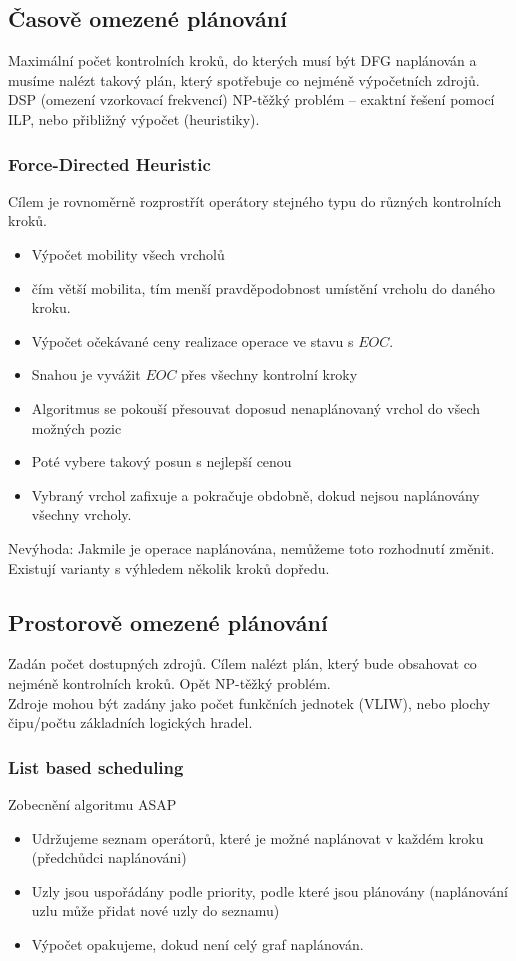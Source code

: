 \documentclass[a4paper, 11pt]{report}
\begin{document}
\subsection{Časově omezené plánování}
Maximální počet kontrolních kroků, do kterých musí být DFG naplánován a musíme nalézt takový plán, který spotřebuje co nejméně výpočetních zdrojů.
DSP (omezení vzorkovací frekvencí)
NP-těžký problém -- exaktní řešení pomocí ILP, nebo přibližný výpočet (heuristiky).

\subsubsection{Force-Directed Heuristic}
Cílem je rovnoměrně rozprostřít operátory stejného typu do různých kontrolních kroků.
\begin{itemize}
	\item Výpočet mobility všech vrcholů
	\item čím větší mobilita, tím menší pravděpodobnost umístění vrcholu do daného kroku.
	\item Výpočet očekávané ceny realizace operace ve stavu s $EOC$.
	\item Snahou je vyvážit $EOC$ přes všechny kontrolní kroky
	\item Algoritmus se pokouší přesouvat doposud nenaplánovaný vrchol do všech možných pozic
	\item Poté vybere takový posun s nejlepší cenou
	\item Vybraný vrchol zafixuje a pokračuje obdobně, dokud nejsou naplánovány všechny vrcholy.
\end{itemize}
Nevýhoda: Jakmile je operace naplánována, nemůžeme toto rozhodnutí změnit. Existují varianty s výhledem několik kroků dopředu.

\subsection{Prostorově omezené plánování}
Zadán počet dostupných zdrojů. Cílem nalézt plán, který bude obsahovat co nejméně kontrolních kroků.
Opět NP-těžký problém.\\
Zdroje mohou být zadány jako počet funkčních jednotek (VLIW), nebo plochy čipu/počtu základních logických hradel.

\subsubsection{List based scheduling}
Zobecnění algoritmu ASAP
\begin{itemize}
	\item Udržujeme seznam operátorů, které je možné naplánovat v každém kroku (předchůdci naplánováni)
	\item Uzly jsou uspořádány podle priority, podle které jsou plánovány (naplánování uzlu může přidat nové uzly do seznamu)
	\item Výpočet opakujeme, dokud není celý graf naplánován.
\end{itemize}
\end{document}
